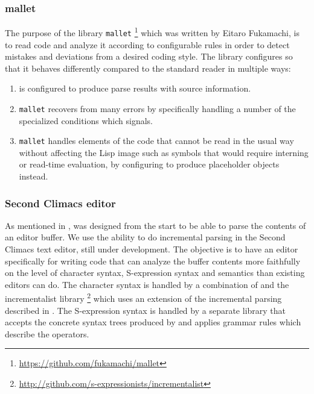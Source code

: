 \subsubsection{mallet}

The purpose of the library \texttt{mallet}%
\footnote{\url{https://github.com/fukamachi/mallet}} which was written
by Eitaro Fukamachi, is to read \cl{} code and analyze it according to
configurable rules in order to detect mistakes and deviations from a
desired coding style.  The library configures \eclector{} so that it
behaves differently compared to the standard reader in multiple ways:

\begin{enumerate}
\item \eclector{} is configured to produce parse results with source
  information.
\item \texttt{mallet} recovers from many errors by specifically
  handling a number of the specialized conditions which \eclector{}
  signals.
\item \texttt{mallet} handles elements of the code that cannot be read
  in the usual way without affecting the Lisp image such as symbols
  that would require interning or read-time evaluation, by configuring
  \eclector{} to produce placeholder objects instead.
\end{enumerate}

\subsubsection{Second Climacs editor}

As mentioned in , \eclector{} was designed from
the start to be able to parse the contents of an editor buffer.  We
use the ability to do incremental parsing in the Second Climacs text
editor, still under development.  The objective is to have an editor
specifically for writing \cl{} code that can analyze the buffer
contents more faithfully on the level of character syntax,
S-expression syntax and semantics than existing editors can do.  The
character syntax is handled by a combination of \eclector{} and the
incrementalist library%
\footnote{\url{http://github.com/s-expressionists/incrementalist}}
which uses an extension of the incremental parsing described in
.  The S-expression syntax is handled
by a separate library that accepts the concrete syntax trees produced
by \eclector{} and applies grammar rules which describe the \cl{}
operators.

